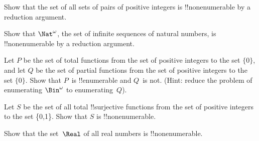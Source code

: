 \documentclass[../../../include/open-logic-section]{subfiles}
\begin{document}
\begin{prob}
Show that the set of all sets of pairs of positive integers is
!!{nonenumerable} by a reduction argument.
\end{prob}

\begin{prob}
Show that $\Nat^\omega$, the set of infinite sequences of
natural numbers, is !!{nonenumerable} by a reduction argument.
\end{prob}

\begin{prob}
Let $P$ be the set of total functions from the set of positive
integers to the set $\{0\}$, and let $Q$ be the set of partial
functions from the set of positive integers to the set $\{0\}$. Show
that $P$~is !!{enumerable} and $Q$~is not. (Hint: reduce the problem
of enumerating $\Bin^\omega$ to enumerating~$Q$).
\end{prob}

\begin{prob}
Let $S$ be the set of all total !!{surjective} functions from the set
of positive integers to the set \{0,1\}. Show that $S$ is
!!{nonenumerable}.
\end{prob}

\begin{prob}
Show that the set~$\Real$ of all real numbers is !!{nonenumerable}.
\end{prob}
\end{document}
